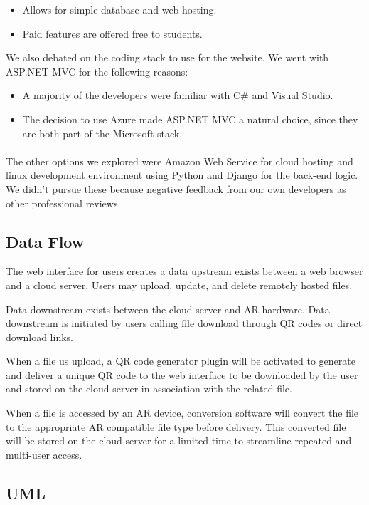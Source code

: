  \begin{itemize}
    \item Allows for simple database and web hosting.
    \item Paid features are offered free to students.
 \end{itemize}

 We also debated on the coding stack to use for the website.
 We went with ASP.NET MVC for the following reasons:
\begin{itemize}
    \item A majority of the developers were familiar with C\# and Visual Studio.
    \item The decision to use Azure made ASP.NET MVC a natural choice, since they are both part of the Microsoft stack.
\end{itemize}

\paragraph{}
The other options we explored were Amazon Web Service for cloud hosting and linux development environment using Python and Django for the back-end logic.
We didn't pursue these because negative feedback from our own developers as other professional reviews.

 \subsection{Data Flow}
The web interface for users creates a data upstream exists between a web browser and a cloud server. Users may upload, update, and delete remotely hosted files.

Data downstream exists between the cloud server and AR hardware. Data downstream is initiated by users calling file download through QR codes or direct download links. 

When a file us upload, a QR code generator plugin will be activated to generate and deliver a unique QR code to the web interface to be downloaded by the user and stored on the cloud server in association with the related file. 

When a file is accessed by an AR device, conversion software will convert the file to the appropriate AR compatible file type before delivery. This converted file will be stored on the cloud server for a limited time to streamline repeated and multi-user access.
  
\subsection{UML}
 
